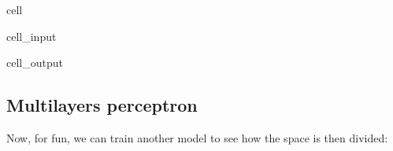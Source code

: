 \documentclass[letterpaper,10pt,english]{jupyterBook}
\begin{document}
\begin{sphinxuseclass}{cell}\begin{sphinxVerbatimInput}

\begin{sphinxuseclass}{cell_input}
\begin{sphinxVerbatim}[commandchars=\\\{\}]
 

   

   
\end{sphinxVerbatim}

\end{sphinxuseclass}\end{sphinxVerbatimInput}
\begin{sphinxVerbatimOutput}

\begin{sphinxuseclass}{cell_output}
\noindent{}

\end{sphinxuseclass}\end{sphinxVerbatimOutput}

\end{sphinxuseclass}

\subsection{Multi\sphinxhyphen{}layers perceptron}
\label{\detokenize{06:multi-layers-perceptron}}
\sphinxAtStartPar
Now, for fun, we can train another model to see how the space is then divided:
\end{document}
